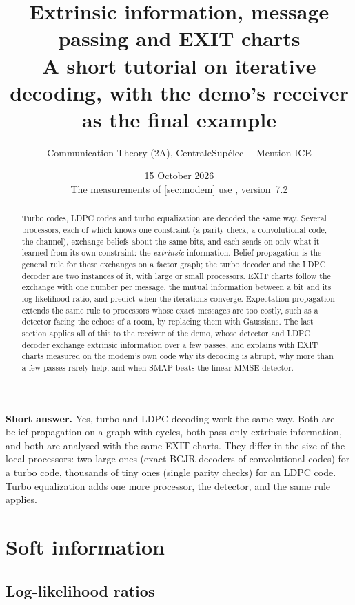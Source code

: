 \documentclass[11pt,a4paper]{article}
\title{\color{icemagenta}\textbf{Extrinsic information, message passing and EXIT charts}\\[4pt]
\large A short tutorial on iterative decoding, with the demo's receiver as the final example}
\author{Communication Theory (2A), CentraleSup\'elec\,---\,Mention ICE}
\date{15 October 2026\\[2pt]\small The measurements of \cref{sec:modem} use \code{audiocomm\_v7.py}, version~7.2}
\theoremstyle{definition}
\theoremstyle{remark}
\newenvironment{keybox}{\begin{center}\begin{lrbox}{\keyboxbin}\begin{minipage}{0.92\textwidth}}{\end{minipage}\end{lrbox}\setlength{\fboxsep}{8pt}\fcolorbox{icemagenta}{iceground}{\usebox{\keyboxbin}}\end{center}}
\begin{document}
\maketitle

\begin{abstract}
\noindent
Turbo codes, LDPC codes and turbo equalization are decoded the same way. Several processors, each of which knows one constraint (a parity check, a convolutional code, the channel), exchange beliefs about the same bits, and each sends on only what it learned from its own constraint: the \emph{extrinsic} information. Belief propagation is the general rule for these exchanges on a factor graph; the turbo decoder and the LDPC decoder are two instances of it, with large or small processors. EXIT charts follow the exchange with one number per message, the mutual information between a bit and its log-likelihood ratio, and predict when the iterations converge. Expectation propagation extends the same rule to processors whose exact messages are too costly, such as a detector facing the echoes of a room, by replacing them with Gaussians. The last section applies all of this to the receiver of the demo, whose detector and LDPC decoder exchange extrinsic information over a few passes, and explains with EXIT charts measured on the modem's own code why its decoding is abrupt, why more than a few passes rarely help, and when SMAP beats the linear MMSE detector.
\end{abstract}

\begin{keybox}
\textbf{Short answer.} Yes, turbo and LDPC decoding work the same way. Both are belief propagation on a graph with cycles, both pass only extrinsic information, and both are analysed with the same EXIT charts. They differ in the size of the local processors: two large ones (exact BCJR decoders of convolutional codes) for a turbo code, thousands of tiny ones (single parity checks) for an LDPC code. Turbo equalization adds one more processor, the detector, and the same rule applies.
\end{keybox}

\tableofcontents

\section{Soft information}
\label{sec:llr}

\subsection{Log-likelihood ratios}
\end{document}
